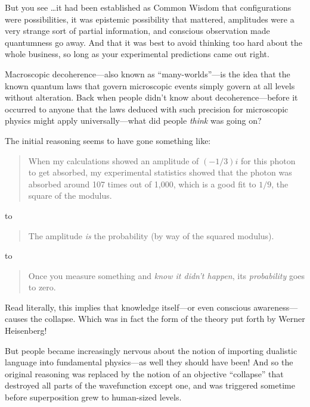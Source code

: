 {
 But you see \ldots it had been established as Common Wisdom that
configurations were possibilities, it was epistemic possibility that
mattered, amplitudes were a very strange sort of partial information,
and conscious observation made quantumness go away. And that it was
best to avoid thinking too hard about the whole business, so long as
your experimental predictions came out right.}

\myendsectiontext


{
 Macroscopic decoherence{}---also known as
``many-worlds''---is the idea that
the known quantum laws that govern microscopic events simply govern at
all levels without alteration. Back when people didn't
know about decoherence---before it occurred to anyone that the laws
deduced with such precision for microscopic physics might apply
universally---what did people \textit{think} was going on? }

{
 The initial reasoning seems to have gone something like:}

\begin{quote}
{
 When my calculations showed an amplitude of $(-1/3)i$ for this
photon to get absorbed, my experimental statistics showed that the
photon was absorbed around 107 times out of 1,000, which is a good fit
to $1/9$, the square of the modulus.}
\end{quote}

{
 to}

\begin{quote}
{
 The amplitude \textit{is} the probability (by way of the squared
 modulus).}
\end{quote}

{
 to}

\begin{quote}
{
 Once you measure something and \textit{know it
didn't happen}, its \textit{probability} goes to zero.}
\end{quote}

{
 Read literally, this implies that knowledge itself---or even
conscious awareness---causes the collapse. Which was in fact the form
of the theory put forth by Werner Heisenberg!}

{
 But people became increasingly nervous about the notion of
importing dualistic language into fundamental physics---as well they
should have been! And so the original reasoning was replaced by the
notion of an objective ``collapse''
that destroyed all parts of the wavefunction except one, and was
triggered sometime before superposition grew to human-sized levels.}

